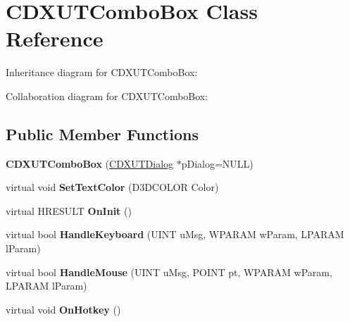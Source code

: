 \hypertarget{class_c_d_x_u_t_combo_box}{\section{C\+D\+X\+U\+T\+Combo\+Box Class Reference}
\label{class_c_d_x_u_t_combo_box}
}


Inheritance diagram for C\+D\+X\+U\+T\+Combo\+Box\+:


Collaboration diagram for C\+D\+X\+U\+T\+Combo\+Box\+:
\subsection*{Public Member Functions}
\begin{DoxyCompactItemize}
\item 
\hypertarget{class_c_d_x_u_t_combo_box_ab7f69be9c0bd5cee7b8057eb73db69c7}{{\bfseries C\+D\+X\+U\+T\+Combo\+Box} (\hyperlink{class_c_d_x_u_t_dialog}{C\+D\+X\+U\+T\+Dialog} $\ast$p\+Dialog=N\+U\+L\+L)}\label{class_c_d_x_u_t_combo_box_ab7f69be9c0bd5cee7b8057eb73db69c7}

\item 
\hypertarget{class_c_d_x_u_t_combo_box_ab023a8c2522432d14096f70fb902a0d4}{virtual void {\bfseries Set\+Text\+Color} (D3\+D\+C\+O\+L\+O\+R Color)}\label{class_c_d_x_u_t_combo_box_ab023a8c2522432d14096f70fb902a0d4}

\item 
\hypertarget{class_c_d_x_u_t_combo_box_a57760cc904757ae273c297245743f3af}{virtual H\+R\+E\+S\+U\+L\+T {\bfseries On\+Init} ()}\label{class_c_d_x_u_t_combo_box_a57760cc904757ae273c297245743f3af}

\item 
\hypertarget{class_c_d_x_u_t_combo_box_abe59d59e89767472038d69260ef73f9d}{virtual bool {\bfseries Handle\+Keyboard} (U\+I\+N\+T u\+Msg, W\+P\+A\+R\+A\+M w\+Param, L\+P\+A\+R\+A\+M l\+Param)}\label{class_c_d_x_u_t_combo_box_abe59d59e89767472038d69260ef73f9d}

\item 
\hypertarget{class_c_d_x_u_t_combo_box_a1cc659081f04fdf657f644d9970a7df8}{virtual bool {\bfseries Handle\+Mouse} (U\+I\+N\+T u\+Msg, P\+O\+I\+N\+T pt, W\+P\+A\+R\+A\+M w\+Param, L\+P\+A\+R\+A\+M l\+Param)}\label{class_c_d_x_u_t_combo_box_a1cc659081f04fdf657f644d9970a7df8}

\item 
\hypertarget{class_c_d_x_u_t_combo_box_a09eecfbd4d5173cf55c15c583b1a2209}{virtual void {\bfseries On\+Hotkey} ()}\label{class_c_d_x_u_t_combo_box_a09eecfbd4d5173cf55c15c583b1a2209}


\end{DoxyCompactItemize}
